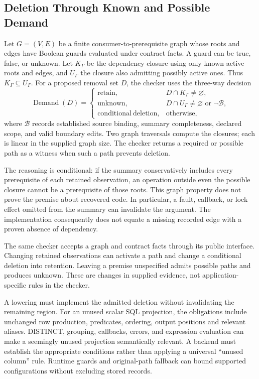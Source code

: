 \documentclass[acmsmall,screen,review,anonymous]{acmart}
\begin{document}
\subsection{Deletion Through Known and Possible Demand}
\label{sec:deletion}
Let $G=(V,E)$ be a finite consumer-to-prerequisite graph whose roots and edges
have Boolean guards evaluated under contract facts. A guard can be true, false,
or unknown. Let $K_\Gamma$ be the dependency closure using only known-active
roots and edges, and $U_\Gamma$ the closure also admitting possibly active ones.
Thus $K_\Gamma\subseteq U_\Gamma$. For a proposed removal set $D$, the checker
uses the three-way decision
\begin{equation}
 \operatorname{Demand}(D)=
 \begin{cases}
  \mathrm{retain}, & D\cap K_\Gamma\ne\varnothing,\\
  \mathrm{unknown}, & D\cap U_\Gamma\ne\varnothing\text{ or }\neg\mathcal{B},\\
  \mathrm{conditional\ deletion}, & \text{otherwise},
 \end{cases}
 \label{eq:demand}
\end{equation}
where $\mathcal{B}$ records established source binding, summary completeness,
declared scope, and valid boundary edits. Two graph traversals compute the
closures; each is linear in the supplied graph size. The checker returns a
required or possible path as a witness when such a path prevents deletion.

The reasoning is conditional: if the summary conservatively includes every
prerequisite of each retained observation, an operation outside even the
possible closure cannot be a prerequisite of those roots. This graph property
does not prove the premise about recovered code. In particular, a fault,
callback, or lock effect omitted from the summary can invalidate the argument.
The implementation consequently does not equate a missing recorded edge with
a proven absence of dependency.

The same checker accepts a graph and contract facts through its public
interface. Changing retained observations can activate a path and change a
conditional deletion into retention. Leaving a premise unspecified admits
possible paths and produces unknown. These are changes in supplied evidence,
not application-specific rules in the checker.

A lowering must implement the admitted deletion without invalidating the
remaining region. For an unused scalar SQL projection, the obligations include
unchanged row production, predicates, ordering, output positions and relevant
aliases. DISTINCT, grouping, callbacks, errors, and expression evaluation can
make a seemingly unused projection semantically relevant. A backend must
establish the appropriate conditions rather than applying a universal
``unused column'' rule. Runtime guards and original-path fallback can bound
supported configurations without excluding stored records.
\end{document}
